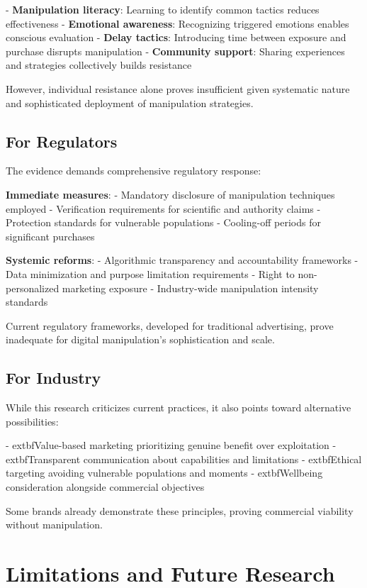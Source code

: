 - \textbf{Manipulation literacy}: Learning to identify common tactics reduces effectiveness
- \textbf{Emotional awareness}: Recognizing triggered emotions enables conscious evaluation
- \textbf{Delay tactics}: Introducing time between exposure and purchase disrupts manipulation
- \textbf{Community support}: Sharing experiences and strategies collectively builds resistance

However, individual resistance alone proves insufficient given systematic nature and sophisticated deployment of manipulation strategies.

\subsection{For Regulators}

The evidence demands comprehensive regulatory response:

\textbf{Immediate measures}:
- Mandatory disclosure of manipulation techniques employed
- Verification requirements for scientific and authority claims  
- Protection standards for vulnerable populations
- Cooling-off periods for significant purchases

\textbf{Systemic reforms}:
- Algorithmic transparency and accountability frameworks
- Data minimization and purpose limitation requirements
- Right to non-personalized marketing exposure
- Industry-wide manipulation intensity standards

Current regulatory frameworks, developed for traditional advertising, prove inadequate for digital manipulation's sophistication and scale.

\subsection{For Industry}

While this research criticizes current practices, it also points toward alternative possibilities:

- 	extbf{Value-based marketing} prioritizing genuine benefit over exploitation
- 	extbf{Transparent communication} about capabilities and limitations
- 	extbf{Ethical targeting} avoiding vulnerable populations and moments
- 	extbf{Wellbeing consideration} alongside commercial objectives

Some brands already demonstrate these principles, proving commercial viability without manipulation.

\section{Limitations and Future Research}
\label{sec:limitations_future_conclusion}

